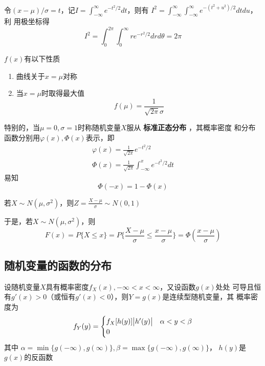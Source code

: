 \documentclass[11pt]{article}
\begin{document}
令\((x-\mu)/\sigma=t\)，记\(I=\int_{-\infty}^\infty e^{-t^2/2}dt\)，则有
\(I^2=\int_{-\infty}^\infty\int_{-\infty}^\infty e^{-(t^2+u^2)/2}dtdu\)，利
用极坐标得
\begin{equation*}
I^2=\int_0^{2\pi}\int_0^\infty re^{-r^2/2}drd\theta=2\pi
\end{equation*}

\(f(x)\)有以下性质
\begin{enumerate}
\item 曲线关于\(x=\mu\)对称
\item 当\(x=\mu\)时取得最大值
\begin{equation*}
f(\mu)=\frac{1}{\sqrt{2\pi}\sigma}
\end{equation*}
\end{enumerate}


特别的，当\(\mu=0,\sigma=1\)时称随机变量\(X\)服从 \textbf{标准正态分布} ，其概率密度
和分布函数分别用\(\varphi(x),\Phi(x)\)表示，即
\begin{gather*}
\varphi(x)=\frac{1}{\sqrt{2\pi}}e^{-t^2/2}\\
\Phi(x)=\frac{1}{\sqrt{2\pi}}\int_{-\infty}^xe^{-t^2/2}dt
\end{gather*}
易知
\begin{equation*}
\Phi(-x)=1-\Phi(x)
\end{equation*}

\begin{lemma}[]
若\(X\sim N(\mu,\sigma^2)\)，则\(Z=\frac{X-\mu}{\sigma}\sim N(0,1)\)
\end{lemma}
于是，若\(X\sim N(\mu,\sigma^2)\)，则
\begin{equation*}
F(x)=P\{X\le x\}=P\{\frac{X-\mu}{\sigma}\le\frac{x-\mu}{\sigma}\}=\Phi(\frac{x-\mu}{\sigma})
\end{equation*}
\subsection{随机变量的函数的分布}
\label{sec:org59ac4ca}
\begin{theorem}[]
设随机变量\(X\)具有概率密度\(f_X(x),-\infty<x<\infty\)，又设函数\(g(x)\)处处
可导且恒有\(g'(x)>0\)（或恒有\(g'(x)<0\)），则\(Y=g(x)\)是连续型随机变量，其
概率密度为
\begin{equation*}
f_Y(y)=
\begin{cases}
f_X[h(y)]\abs{h'(y)}&\alpha<y<\beta\\
0&
\end{cases}
\end{equation*}
其中
\(\alpha=\min\{g(-\infty),g(\infty)\},\beta=\max\{g(-\infty),g(\infty)\}\)，
\(h(y)\)是\(g(x)\)的反函数
\end{theorem}
\end{document}
